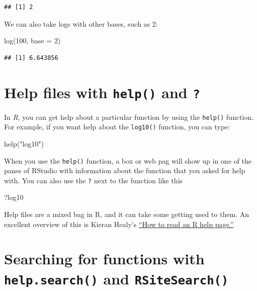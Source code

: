\documentclass[
]{book}
\newenvironment{Shaded}{\begin{snugshade}}{\end{snugshade}}
\newcommand{\AttributeTok}[1]{\textcolor[rgb]{0.77,0.63,0.00}{#1}}
\newcommand{\DecValTok}[1]{\textcolor[rgb]{0.00,0.00,0.81}{#1}}
\newcommand{\FunctionTok}[1]{\textcolor[rgb]{0.00,0.00,0.00}{#1}}
\newcommand{\NormalTok}[1]{#1}
\newcommand{\StringTok}[1]{\textcolor[rgb]{0.31,0.60,0.02}{#1}}
\begin{document}
\begin{verbatim}
## [1] 2
\end{verbatim}

We can also take logs with other bases, such as 2:

\begin{Shaded}
\begin{Highlighting}[]
\FunctionTok{log}\NormalTok{(}\DecValTok{100}\NormalTok{, }\AttributeTok{base =} \DecValTok{2}\NormalTok{)}
\end{Highlighting}
\end{Shaded}

\begin{verbatim}
## [1] 6.643856
\end{verbatim}

\hypertarget{help-files-with-help-and}{%
\section{\texorpdfstring{Help files with \texttt{help()} and \texttt{?}}{Help files with help() and ?}}\label{help-files-with-help-and}}

In \emph{R}, you can get help about a particular function by using the \texttt{help()} function. For example, if you want help about the \texttt{log10()} function, you can type:

\begin{Shaded}
\begin{Highlighting}[]
\FunctionTok{help}\NormalTok{(}\StringTok{"log10"}\NormalTok{)}
\end{Highlighting}
\end{Shaded}

When you use the \texttt{help()} function, a box or web pag will show up in one of the panes of RStudio with information about the function that you asked for help with. You can also use the \texttt{?} next to the function like this

\begin{Shaded}
\begin{Highlighting}[]
\NormalTok{?log10}
\end{Highlighting}
\end{Shaded}

Help files are a mixed bag in R, and it can take some getting used to them. An excellent overview of this is Kieran Healy's \href{https://socviz.co/appendix.html}{``How to read an R help page.''}

\hypertarget{searching-for-functions-with-help.search-and-rsitesearch}{%
\section{\texorpdfstring{Searching for functions with \texttt{help.search()} and \texttt{RSiteSearch()}}{Searching for functions with help.search() and RSiteSearch()}}\label{searching-for-functions-with-help.search-and-rsitesearch}}
\end{document}
